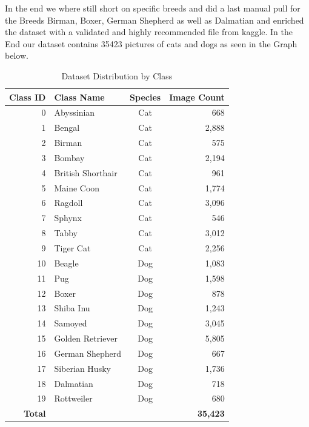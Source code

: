 In the end we where still short on specific breeds and did a last manual pull for the Breeds Birman, Boxer, German Shepherd as well as Dalmatian and enriched the dataset with a validated and highly recommended file from kaggle. 
In the End our dataset contains 35423 pictures of cats and dogs as seen in the Graph below. 

\begin{table}[htbp]
\centering
\caption{Dataset Distribution by Class}
\label{tab:dataset_distribution}
\begin{tabular}{r l c r}
\hline
\textbf{Class ID} & \textbf{Class Name} & \textbf{Species} & \textbf{Image Count} \\
\hline
0  & Abyssinian         & Cat & 668 \\
1  & Bengal             & Cat & 2,888 \\
2  & Birman             & Cat & 575 \\
3  & Bombay             & Cat & 2,194 \\
4  & British Shorthair  & Cat & 961 \\
5  & Maine Coon         & Cat & 1,774 \\
6  & Ragdoll            & Cat & 3,096 \\
7  & Sphynx             & Cat & 546 \\
8  & Tabby              & Cat & 3,012 \\
9  & Tiger Cat          & Cat & 2,256 \\
\hline
10 & Beagle             & Dog & 1,083 \\
11 & Pug                & Dog & 1,598 \\
12 & Boxer              & Dog & 878 \\
13 & Shiba Inu          & Dog & 1,243 \\
14 & Samoyed            & Dog & 3,045 \\
15 & Golden Retriever   & Dog & 5,805 \\
16 & German Shepherd    & Dog & 667 \\
17 & Siberian Husky     & Dog & 1,736 \\
18 & Dalmatian          & Dog & 718 \\
19 & Rottweiler         & Dog & 680 \\
\hline
\textbf{Total} & & & \textbf{35,423} \\
\hline
\end{tabular}
\end{table}
